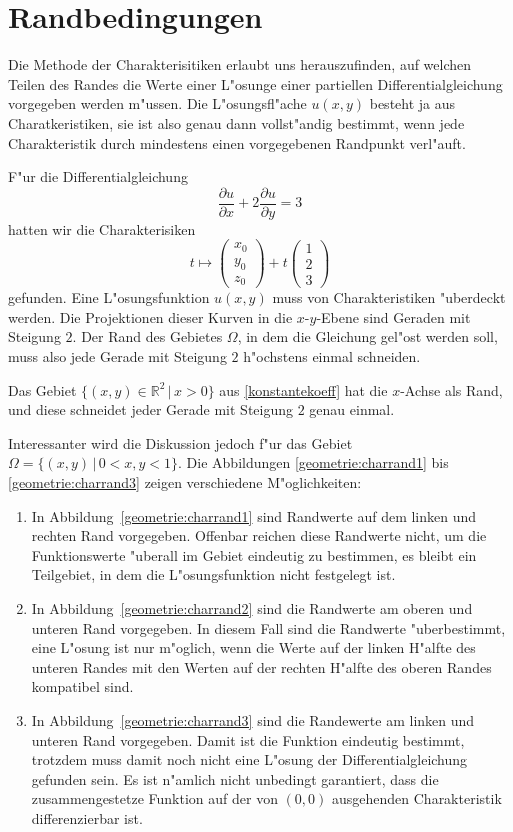 \section{Randbedingungen}
Die Methode der Charakterisitiken erlaubt uns herauszufinden, auf welchen
Teilen des Randes die Werte einer L"osunge einer partiellen
Differentialgleichung vorgegeben werden m"ussen.
Die L"osungsfl"ache $u(x,y)$ besteht ja aus Charatkeristiken, sie ist also
genau dann vollst"andig bestimmt, wenn jede Charakteristik durch mindestens 
einen vorgegebenen Randpunkt verl"auft.

F"ur die Differentialgleichung
\begin{equation}
\frac{\partial u}{\partial x}+2\frac{\partial u}{\partial y}=3
\label{geometrie:knickbeispiel}
\end{equation}
hatten wir die Charakterisiken 
\[
t\mapsto\begin{pmatrix}x_0\\y_0\\z_0\end{pmatrix}+t\begin{pmatrix}1\\2\\3\end{pmatrix}
\]
gefunden. Eine L"osungsfunktion $u(x,y)$ muss von Charakteristiken
"uberdeckt werden. 
Die Projektionen dieser Kurven in die $x$-$y$-Ebene sind Geraden
mit Steigung $2$. Der Rand des Gebietes $\Omega$, in dem die Gleichung gel"ost
werden soll, muss also jede Gerade mit Steigung $2$ h"ochstens einmal
schneiden.

Das Gebiet $\{(x,y)\in\mathbb R^2\,|\, x >0\}$  aus \ref{konstantekoeff}
hat die $x$-Achse als Rand, und diese schneidet jeder Gerade mit Steigung
$2$ genau einmal.

Interessanter wird die Diskussion jedoch f"ur das Gebiet
$\Omega=\{(x,y)\,|\,0<x,y<1\}$. Die Abbildungen \ref{geometrie:charrand1}
bis \ref{geometrie:charrand3} zeigen verschiedene M"oglichkeiten:
\begin{enumerate}
\item
In Abbildung~\ref{geometrie:charrand1} sind Randwerte auf dem linken
und rechten Rand vorgegeben. Offenbar reichen diese Randwerte nicht, um
die Funktionswerte "uberall im Gebiet eindeutig zu bestimmen, es bleibt
ein Teilgebiet, in dem die L"osungsfunktion nicht festgelegt ist.
\item
In Abbildung~\ref{geometrie:charrand2}
sind die Randwerte am oberen und unteren Rand vorgegeben.
In diesem Fall sind die Randwerte "uberbestimmt, eine L"osung ist
nur m"oglich, wenn die Werte auf der linken H"alfte des unteren
Randes mit den Werten auf der rechten H"alfte des oberen Randes
kompatibel sind.
\item
In Abbildung~\ref{geometrie:charrand3}
sind die Randewerte am linken und unteren Rand vorgegeben.
Damit ist die Funktion eindeutig bestimmt, trotzdem
muss damit noch nicht eine L"osung der Differentialgleichung
gefunden sein.
Es ist n"amlich nicht unbedingt garantiert, dass die zusammengestetze
Funktion 
auf der von $(0,0)$ ausgehenden Charakteristik differenzierbar ist.
\end{enumerate}

